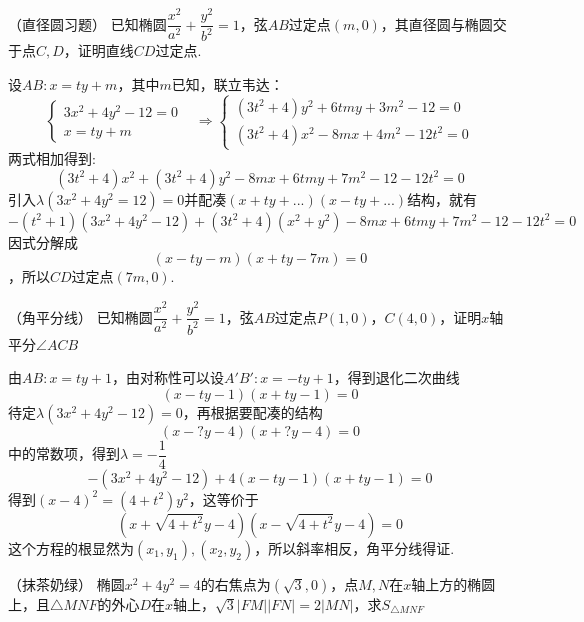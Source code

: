 \begin{example}{（直径圆习题）}{}
    已知椭圆$\dfrac{x^2}{a^2}+\dfrac{y^2}{b^2}=1$，弦$AB$过定点$(m,0)$，其直径圆与椭圆交于点$C,D$，证明直线$CD$过定点.
\end{example}
\begin{solution}
    设$AB:x=ty+m$，其中$m$已知，联立韦达：\[\begin{cases}3x^{2}+4y^{2}-12=0\\x=ty+m&\end{cases}\Rightarrow\begin{cases}(3t^{2}+4)y^{2}+6tmy+3m^{2}-12=0\\(3t^{2}+4)x^{2}-8mx+4m^{2}-12t^{2}=0\end{cases}\]
    两式相加得到:\[(3t^2+4)x^2+(3t^2+4)y^2-8mx+6tmy+7m^2-12-12t^2=0\]
    引入$\lambda(3x^2+4y^2=12)=0$并配凑$(x+ty+...)(x-ty+...)$结构，就有
    \[-(t^2+1)(3x^{2}+4y^{2}-12)+(3t^{2}+4)(x^{2}+y^{2})-8mx+6tmy+7m^{2}-12-12t^{2}=0\]
    因式分解成\[(x-ty-m)(x+ty-7m)=0\]，所以$CD$过定点$(7m,0)$.
\end{solution}
\begin{example}{（角平分线）}
    已知椭圆$\dfrac{x^2}{a^2}+\dfrac{y^2}{b^2}=1$，弦$AB$过定点$P(1,0)$，$C(4,0)$，证明$x$轴平分$\angle{ACB}$
\end{example}
\begin{solution}
    由$AB:x=ty+1$，由对称性可以设$A'B':x=-ty+1$，得到退化二次曲线\[(x-ty-1)(x+ty-1)=0\]
    待定$\lambda(3x^2+4y^2-12)=0$，再根据要配凑的结构
    \[(x-?y-4)(x+?y-4)=0\]中的常数项，得到$\lambda=-\dfrac14$
    \[-(3x^{2}+4y^{2}-12)+4(x-ty-1)(x+ty-1)=0\]
    得到$(x-4)^2=(4+t^2)y^2$，这等价于\[(x+\sqrt{4+t^2}y-4)(x-\sqrt{4+t^2}y-4)=0\]
    这个方程的根显然为$(x_1,y_1),(x_2,y_2)$，所以斜率相反，角平分线得证.
\end{solution}
\newpage
\begin{example}{（抹茶奶绿）}{}
    椭圆$x^2+4y^2=4$的右焦点为$(\sqrt3,0)$，点$M,N$在$x$轴上方的椭圆上，且$\triangle{MNF}$的外心$D$在$x$轴上，$\sqrt{3}|FM||FN|=2|MN|$，求$S_{\triangle{MNF}}$
\end{example}
